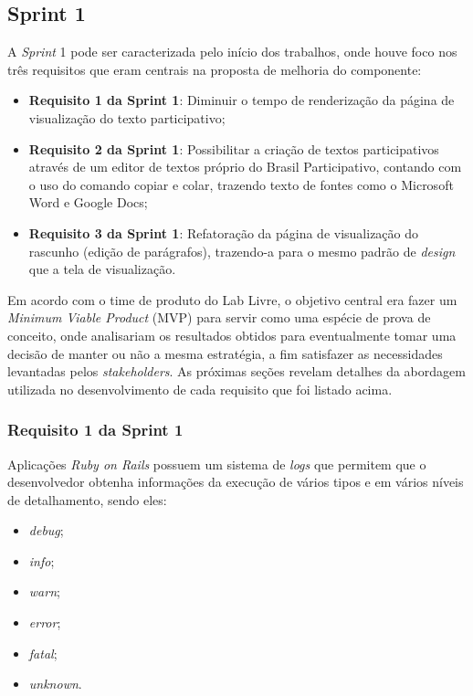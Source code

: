 \subsection {Sprint 1}

A \textit{Sprint} 1 pode ser caracterizada pelo início dos trabalhos, onde houve foco nos três requisitos que eram centrais na proposta de melhoria do componente:

\begin{itemize}
	\item \textbf{Requisito 1 da Sprint 1}: Diminuir o tempo de renderização da página de visualização do texto participativo;
	\item \textbf{Requisito 2 da Sprint 1}: Possibilitar a criação de textos participativos através de um editor de textos próprio do Brasil Participativo, contando com o uso do comando copiar e colar, trazendo texto de fontes como o Microsoft Word e Google Docs;
	\item \textbf{Requisito 3 da Sprint 1}: Refatoração da página de visualização do rascunho (edição de parágrafos), trazendo-a para o mesmo padrão de \textit{design} que a tela de visualização.
\end{itemize}

Em acordo com o time de produto  do Lab Livre, o objetivo central era fazer um \textit{Minimum Viable Product} (MVP) para servir como uma espécie de prova de conceito, onde analisariam os resultados obtidos para eventualmente tomar uma decisão de manter ou não a mesma estratégia, a fim satisfazer as necessidades levantadas pelos \textit{stakeholders}. As próximas seções revelam detalhes da abordagem utilizada no desenvolvimento de cada requisito que foi listado acima.

\subsubsection {Requisito 1 da Sprint 1}

Aplicações \textit{Ruby on Rails} possuem um sistema de \textit{logs} que permitem que o desenvolvedor obtenha informações da execução de vários tipos e em vários níveis de detalhamento, sendo eles:

\begin{itemize}
	\item \textit{debug};
	\item \textit{info};
	\item \textit{warn};
	\item \textit{error};
	\item \textit{fatal};
	\item \textit{unknown}.
\end{itemize}

